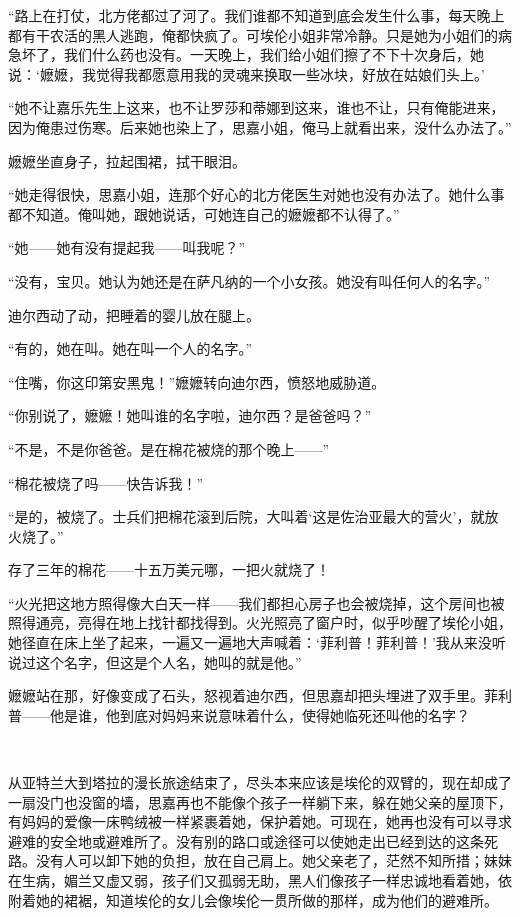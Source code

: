 \par “路上在打仗，北方佬都过了河了。我们谁都不知道到底会发生什么事，每天晚上都有干农活的黑人逃跑，俺都快疯了。可埃伦小姐非常冷静。只是她为小姐们的病急坏了，我们什么药也没有。一天晚上，我们给小姐们擦了不下十次身后，她说：‘嬷嬷，我觉得我都愿意用我的灵魂来换取一些冰块，好放在姑娘们头上。’
\par “她不让嘉乐先生上这来，也不让罗莎和蒂娜到这来，谁也不让，只有俺能进来，因为俺患过伤寒。后来她也染上了，思嘉小姐，俺马上就看出来，没什么办法了。”
\par 嬷嬷坐直身子，拉起围裙，拭干眼泪。
\par “她走得很快，思嘉小姐，连那个好心的北方佬医生对她也没有办法了。她什么事都不知道。俺叫她，跟她说话，可她连自己的嬷嬷都不认得了。”
\par “她——她有没有提起我——叫我呢？”
\par “没有，宝贝。她认为她还是在萨凡纳的一个小女孩。她没有叫任何人的名字。”
\par 迪尔西动了动，把睡着的婴儿放在腿上。
\par “有的，她在叫。她在叫一个人的名字。”
\par “住嘴，你这印第安黑鬼！”嬷嬷转向迪尔西，愤怒地威胁道。
\par “你别说了，嬷嬷！她叫谁的名字啦，迪尔西？是爸爸吗？”
\par “不是，不是你爸爸。是在棉花被烧的那个晚上——”
\par “棉花被烧了吗——快告诉我！”
\par “是的，被烧了。士兵们把棉花滚到后院，大叫着‘这是佐治亚最大的营火’，就放火烧了。”
\par 存了三年的棉花——十五万美元哪，一把火就烧了！
\par “火光把这地方照得像大白天一样——我们都担心房子也会被烧掉，这个房间也被照得通亮，亮得在地上找针都找得到。火光照亮了窗户时，似乎吵醒了埃伦小姐，她径直在床上坐了起来，一遍又一遍地大声喊着：‘菲利普！菲利普！’我从来没听说过这个名字，但这是个人名，她叫的就是他。”
\par 嬷嬷站在那，好像变成了石头，怒视着迪尔西，但思嘉却把头埋进了双手里。菲利普——他是谁，他到底对妈妈来说意味着什么，使得她临死还叫他的名字？
\par  
\par 从亚特兰大到塔拉的漫长旅途结束了，尽头本来应该是埃伦的双臂的，现在却成了一扇没门也没窗的墙，思嘉再也不能像个孩子一样躺下来，躲在她父亲的屋顶下，有妈妈的爱像一床鸭绒被一样紧裹着她，保护着她。可现在，她再也没有可以寻求避难的安全地或避难所了。没有别的路口或途径可以使她走出已经到达的这条死路。没有人可以卸下她的负担，放在自己肩上。她父亲老了，茫然不知所措；妹妹在生病，媚兰又虚又弱，孩子们又孤弱无助，黑人们像孩子一样忠诚地看着她，依附着她的裙裾，知道埃伦的女儿会像埃伦一贯所做的那样，成为他们的避难所。
